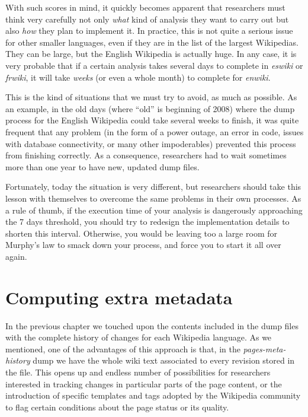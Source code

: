 With such scores in mind, it quickly becomes apparent that researchers must think
very carefully not only \textit{what} kind of analysis they want to carry out but
also \textit{how} they plan to implement it. In practice, this is not quite a serious
issue for other smaller languages, even if they are in the list of the largest
Wikipedias. They can be large, but the English Wikipedia is actually huge. 
In any case, it is very probable that if a certain analysis takes several days 
to complete in \textit{eswiki} or \textit{frwiki}, it will take \textit{weeks} (or
even a whole month) to complete for \textit{enwiki}.

This is the kind of situations that we must try to avoid, as much as possible.
As an example, in the old days (where ``old'' is beginning of 2008) where the dump process
for the English Wikipedia could take several weeks to finish, it was quite frequent
that any problem (in the form of a power outage, an error in code, issues with
database connectivity, or many other impoderables) prevented this process from
finishing correctly. As a consequence, researchers had to wait sometimes more
than one year to have new, updated dump files.

Fortunately, today the situation is very different, but researchers should take
this lesson with themselves to overcome the same problems in their own processes.
As a rule of thumb, if the execution time of your analysis is dangerously approaching
the 7 days threshold, you should try to redesign the implementation details to
shorten this interval. Otherwise, you would be leaving too a large room for 
Murphy's law to smack down your process, and force you to start it all over again.

\section{Computing extra metadata}
In the previous chapter we touched upon the contents included in the dump files
with the complete history of changes for each Wikipedia language. As we mentioned,
one of the advantages of this approach is that, in the \textit{pages-meta-history}
dump we have the whole wiki text associated to every revision stored in the file.
This opens up and endless number of possibilities for researchers interested in
tracking changes in particular parts of the page content, or the introduction of
specific templates and tags adopted by the Wikipedia community to flag certain
conditions about the page status or its quality.

